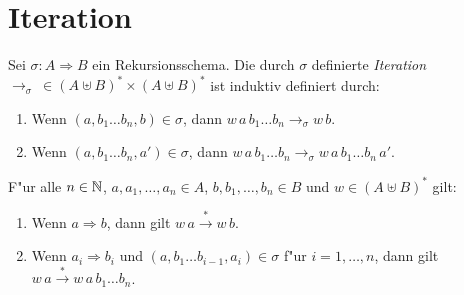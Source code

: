 \documentclass[12pt,a4paper]{article}
\begin{document}



\section{Iteration}

\begin{definition}[Iteration]
  Sei $\sigma: A \Rightarrow B$ ein Rekursionsschema. Die durch $\sigma$ definierte \emph{Iteration}
  $\to_\sigma\ \in (A \uplus B)^* \times (A \uplus B)^*$ ist induktiv definiert durch:
  \begin{enumerate}
  \item Wenn $(a,b_1 \ldots b_n,b) \in \sigma$,
    dann $w\,a\,b_1 \ldots b_n \to_\sigma w\,b$.
  \item Wenn $(a,b_1 \ldots b_n,a') \in \sigma$,
    dann $w\,a\,b_1 \ldots b_n \to_\sigma w\,a\,b_1 \ldots b_n\,a'$.
  \end{enumerate}
\end{definition}

\begin{theorem}
  F"ur alle $n \in \mathbb N$, $a,a_1,\ldots,a_n \in A$, $b,b_1,\ldots,b_n \in B$ und $w \in (A \uplus B)^*$ gilt:
  \begin{enumerate}
  \item Wenn $a \Rightarrow b$, dann gilt $w\,a \stackrel{*}{\to} w\,b$.
  \item Wenn $a_i \Rightarrow b_i$ und $(a,b_1 \ldots b_{i-1},a_i) \in \sigma$ f"ur $i=1,\ldots,n$, dann gilt
    $w\,a \stackrel{*}{\to} w\,a\,b_1 \ldots b_n$.
  \end{enumerate}
\end{theorem}
\end{document}
